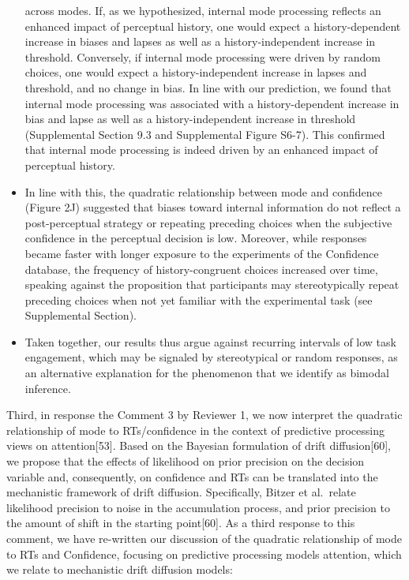 \documentclass[
]{article}
\begin{document}
\begin{itemize}
  across modes. If, as we hypothesized, internal mode processing
  reflects an enhanced impact of perceptual history, one would expect a
  history-dependent increase in biases and lapses as well as a
  history-independent increase in threshold. Conversely, if internal
  mode processing were driven by random choices, one would expect a
  history-independent increase in lapses and threshold, and no change in
  bias. In line with our prediction, we found that internal mode
  processing was associated with a history-dependent increase in bias
  and lapse as well as a history-independent increase in threshold
  (Supplemental Section 9.3 and Supplemental Figure S6-7). This
  confirmed that internal mode processing is indeed driven by an
  enhanced impact of perceptual history.
\item
  In line with this, the quadratic relationship between mode and
  confidence (Figure 2J) suggested that biases toward internal
  information do not reflect a post-perceptual strategy or repeating
  preceding choices when the subjective confidence in the perceptual
  decision is low. Moreover, while responses became faster with longer
  exposure to the experiments of the Confidence database, the frequency
  of history-congruent choices increased over time, speaking against the
  proposition that participants may stereotypically repeat preceding
  choices when not yet familiar with the experimental task (see
  Supplemental Section).
\item
  Taken together, our results thus argue against recurring intervals of
  low task engagement, which may be signaled by stereotypical or random
  responses, as an alternative explanation for the phenomenon that we
  identify as bimodal inference.
\end{itemize}

Third, in response the Comment 3 by Reviewer 1, we now interpret the
quadratic relationship of mode to RTs/confidence in the context of
predictive processing views on attention{[}53{]}. Based on the Bayesian
formulation of drift diffusion{[}60{]}, we propose that the effects of
likelihood on prior precision on the decision variable and,
consequently, on confidence and RTs can be translated into the
mechanistic framework of drift diffusion. Specifically, Bitzer et
al.~relate likelihood precision to noise in the accumulation process,
and prior precision to the amount of shift in the starting
point{[}60{]}. As a third response to this comment, we have re-written
our discussion of the quadratic relationship of mode to RTs and
Confidence, focusing on predictive processing models attention, which we
relate to mechanistic drift diffusion models:
\end{document}
